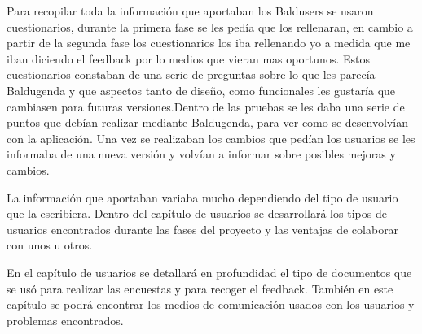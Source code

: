 Para recopilar toda la información que aportaban los Baldusers se usaron cuestionarios, durante la primera fase se les pedía que los rellenaran, en cambio a partir de la segunda fase los cuestionarios los iba rellenando yo a medida que me iban diciendo el feedback por lo medios que vieran mas oportunos. Estos cuestionarios constaban de una serie de preguntas sobre lo que les parecía Baldugenda y que aspectos tanto de diseño, como funcionales les gustaría que cambiasen para futuras versiones.Dentro de las pruebas se les daba una serie de puntos que debían realizar mediante Baldugenda, para ver como se desenvolvían con la aplicación. Una vez se realizaban los cambios que pedían los usuarios se les informaba de una nueva versión y volvían a informar sobre posibles mejoras y cambios. 

La información  que aportaban variaba mucho dependiendo del tipo de usuario que la escribiera. Dentro del capítulo de usuarios se desarrollará los tipos de usuarios encontrados durante las fases del proyecto y las ventajas de colaborar con unos u otros.

En el capítulo de usuarios se detallará en profundidad el tipo de documentos que se usó para realizar las encuestas y para recoger el feedback. También en este capítulo se podrá encontrar los medios de comunicación usados con los usuarios y problemas encontrados.
\nocite{*}






















